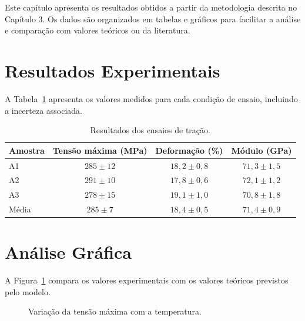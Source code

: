 Este capítulo apresenta os resultados obtidos a partir da metodologia descrita no Capítulo 3. Os dados são organizados em tabelas e gráficos para facilitar a análise e comparação com valores teóricos ou da literatura.

\section{Resultados Experimentais}

A Tabela~\ref{tab:resultados} apresenta os valores medidos para cada condição de ensaio, incluindo a incerteza associada.

\begin{table}[H]
\centering
\caption{Resultados dos ensaios de tração.}
\label{tab:resultados}
\begin{tabular}{lccc}
\toprule
Amostra & Tensão máxima (MPa) & Deformação (\%) & Módulo (GPa) \\
\midrule
A1 & $285 \pm 12$ & $18,2 \pm 0,8$ & $71,3 \pm 1,5$ \\
A2 & $291 \pm 10$ & $17,8 \pm 0,6$ & $72,1 \pm 1,2$ \\
A3 & $278 \pm 15$ & $19,1 \pm 1,0$ & $70,8 \pm 1,8$ \\
\midrule
Média & $285 \pm 7$ & $18,4 \pm 0,5$ & $71,4 \pm 0,9$ \\
\bottomrule
\end{tabular}
\end{table}

\section{Análise Gráfica}

A Figura~\ref{fig:resultados} compara os valores experimentais com os valores teóricos previstos pelo modelo.

\begin{figure}[H]
\centering
{}
\caption{Variação da tensão máxima com a temperatura.}
\label{fig:resultados}
\end{figure}

